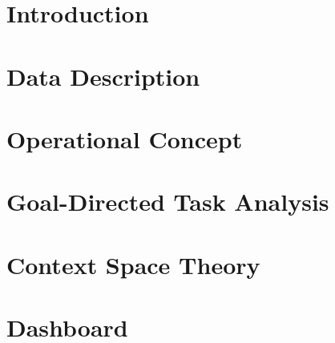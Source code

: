 \documentclass[11pt]{report}
\begin{document}


\tableofcontents

\chapter[Introduction]{Introduction}\label{ch:introduction}


\chapter[Data Description]{Data Description}\label{ch:data-description}


\chapter[Operational Concept]{Operational Concept}\label{ch:operationalconcept}


\chapter[Goal-Directed Task Analysis]{Goal-Directed Task Analysis}\label{ch:gdta}


\chapter[Context Space Theory]{Context Space Theory}\label{ch:cst}


\chapter[Dashboard]{Dashboard}\label{ch:dashboard}



\setcounter{page}{1}


\listoffigures
\listoftables
\end{document}
